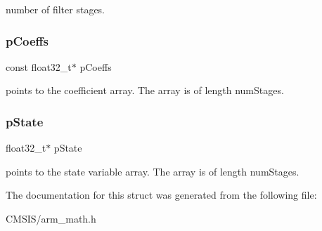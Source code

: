number of filter stages. \mbox{\label{structarm__fir__lattice__instance__f32_a39230f04a29d8321948e339633780442}} 
\subsubsection{\texorpdfstring{pCoeffs}{pCoeffs}}
{\footnotesize\ttfamily const float32\+\_\+t$\ast$ p\+Coeffs}

points to the coefficient array. The array is of length num\+Stages. \mbox{\label{structarm__fir__lattice__instance__f32_a335c87e6fdc4b96601d95a5de8b9c463}} 
\subsubsection{\texorpdfstring{pState}{pState}}
{\footnotesize\ttfamily float32\+\_\+t$\ast$ p\+State}

points to the state variable array. The array is of length num\+Stages. 

The documentation for this struct was generated from the following file\+:\begin{DoxyCompactItemize}
\item 
C\+M\+S\+I\+S/arm\+\_\+math.\+h\end{DoxyCompactItemize}
